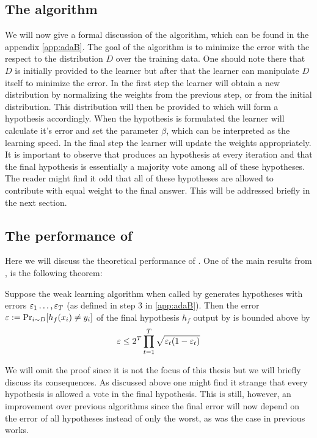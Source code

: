 \subsection{The algorithm}
\label{subsec:algo}
We will now give a formal discussion of the \adaB\cite{Freund1997} algorithm, which can be found in the appendix \ref{app:adaB}. The goal of the algorithm is to minimize the error with the respect to the distribution $D$ over the training data. One should note there that $D$ is initially provided to the learner but after that the learner can manipulate $D$ itself to minimize the error. In the first step the learner will obtain a new distribution by normalizing the weights from the previous step, or from the initial distribution. This distribution will then be provided to \weak which will form a hypothesis accordingly. When the hypothesis is formulated the learner will calculate it's error and set the parameter $\beta$, which can be interpreted as the learning speed. In the final step the learner will update the weights appropriately. It is important to observe that \weak produces an hypothesis at every iteration and that the final hypothesis is essentially a majority vote among all of these hypotheses. The reader might find it odd that all of these hypotheses are allowed to contribute with equal weight to the final answer. This will be addressed briefly in the next section.  

\subsection{The performance of \adaB}
\label{subsec:perf}
Here we will discuss the theoretical performance of \adaB. One of the main results from \cite{Freund1997}, is the following theorem: 
\begin{theorem}\label{thm:adaErr}\cite{Freund1997}
Suppose the weak learning algorithm \weak when called by \adaB generates hypotheses with errors $\varepsilon_1\ldots, \varepsilon_T$ (as defined in step 3 in \ref{app:adaB}). Then the error \\$\varepsilon:=\Pr_{i\sim D}[h_f(x_i)\neq y_i]$ of the final hypothesis $h_f$ output by \adaB is bounded above by $$\varepsilon\leq 2^T\prod^T_{t=1}\sqrt{\varepsilon_t(1-\varepsilon_t)}$$
\end{theorem}
We will omit the proof since it is not the focus of this thesis but we will briefly discuss its consequences. As discussed above one might find it strange that every hypothesis is allowed a vote in the final hypothesis. This is still, however, an improvement over previous algorithms since the final error will now depend on the error of all hypotheses instead of only the worst, as was the case in previous works. 